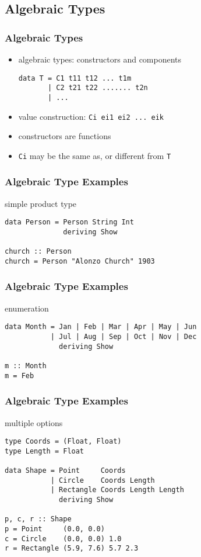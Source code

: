 \documentclass[dvipsnames]{beamer}
\theoremstyle{plain}
\begin{document}
\subsection{Algebraic Types}

\begin{frame}[fragile]
  \frametitle{Algebraic Types}

  \begin{itemize}
    \item \alert{algebraic types}: constructors and components
    \begin{lstlisting}[style=syntax]
data T = C1 t11 t12 ... t1m
       | C2 t21 t22 ....... t2n
       | ...
    \end{lstlisting}
    \item value construction: \lstinline|Ci ei1 ei2 ... eik|
    \item constructors are functions
    \item \lstinline|Ci| may be the same as, or different from \lstinline|T|
  \end{itemize}
\end{frame}

\begin{frame}[fragile]
  \frametitle{Algebraic Type Examples}

  \begin{exampleblock}{simple product type}
    \begin{lstlisting}
data Person = Person String Int
              deriving Show

church :: Person
church = Person "Alonzo Church" 1903
    \end{lstlisting}
  \end{exampleblock}
\end{frame}

\begin{frame}[fragile]
  \frametitle{Algebraic Type Examples}

  \begin{exampleblock}{enumeration}
    \begin{lstlisting}
data Month = Jan | Feb | Mar | Apr | May | Jun
           | Jul | Aug | Sep | Oct | Nov | Dec
             deriving Show

m :: Month
m = Feb
    \end{lstlisting}
  \end{exampleblock}
\end{frame}

\begin{frame}[fragile]
  \frametitle{Algebraic Type Examples}

  \begin{exampleblock}{multiple options}
    \begin{lstlisting}
type Coords = (Float, Float)
type Length = Float

data Shape = Point     Coords
           | Circle    Coords Length
           | Rectangle Coords Length Length
             deriving Show

p, c, r :: Shape
p = Point     (0.0, 0.0)
c = Circle    (0.0, 0.0) 1.0
r = Rectangle (5.9, 7.6) 5.7 2.3
    \end{lstlisting}
  \end{exampleblock}
\end{frame}
\end{document}
